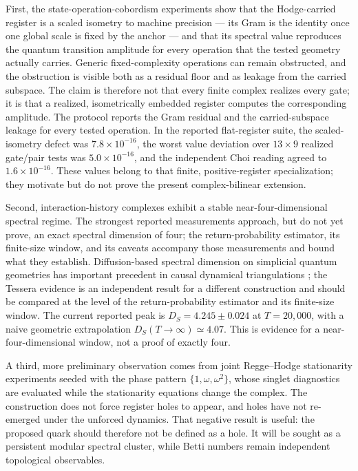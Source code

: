\documentclass[11pt,letterpaper]{article}
\begin{document}
First, the state-operation-cobordism experiments show that the Hodge-carried
register is a scaled isometry to machine precision --- its Gram is the
identity once one global scale is fixed by the anchor --- and that its spectral
value
reproduces the quantum transition amplitude for every operation that the tested
geometry actually carries. Generic fixed-complexity operations can remain
obstructed, and the obstruction is visible both as a residual floor and as
leakage from the carried subspace. The claim is therefore not that every finite
complex realizes every gate; it is that a realized, isometrically embedded
register computes the corresponding amplitude. The protocol reports the Gram
residual and the carried-subspace leakage for every tested operation.
In the reported flat-register suite, the scaled-isometry defect was
$7.8\times10^{-16}$, the worst value deviation over
$13\times9$ realized gate/pair tests was $5.0\times10^{-16}$, and the
independent Choi reading agreed to $1.6\times10^{-16}$. These values belong to
that finite, positive-register specialization; they motivate but do not prove
the present complex-bilinear extension.

Second, interaction-history complexes exhibit a stable near-four-dimensional
spectral regime. The strongest reported measurements approach, but do not yet
prove, an exact spectral dimension of four; the return-probability estimator,
its finite-size window, and its caveats accompany those measurements and bound
what they establish. Diffusion-based spectral
dimension on simplicial quantum geometries has important precedent in causal
dynamical triangulations \cite{ajl2005}; the Tessera evidence is an independent
result for a different construction and should be compared at the level of the
return-probability estimator and its finite-size window.
The current reported peak is $D_S=4.245\pm0.024$ at
$T=20{,}000$, with a naive geometric extrapolation
$D_S(T\to\infty)\simeq4.07$. This is evidence for a near-four-dimensional
window, not a proof of exactly four.

A third, more preliminary observation comes from joint Regge--Hodge
stationarity experiments seeded with the phase pattern
$\{1,\omega,\omega^{2}\}$, whose singlet diagnostics are evaluated while the
stationarity equations change the complex. The construction does not force
register holes to appear, and holes have not re-emerged under the unforced
dynamics. That negative result is useful: the
proposed quark should therefore not be defined as a hole. It will be sought as
a persistent modular spectral cluster, while Betti numbers remain independent
topological observables.
\end{document}

